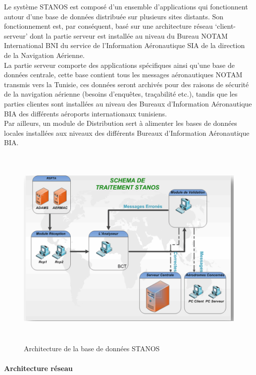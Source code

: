 Le système STANOS est composé d’un ensemble d’applications qui fonctionnent autour d’une base de données distribuée sur plusieurs sites distants. Son fonctionnement est, par conséquent, basé sur une architecture réseau ‘client-serveur’ dont la partie serveur est installée au niveau du Bureau NOTAM International BNI du service de l’Information Aéronautique SIA de la direction de la Navigation Aérienne.\\

La partie serveur comporte des applications spécifiques ainsi qu’une base de données centrale, cette base contient tous les messages aéronautiques NOTAM transmis vers la Tunisie, ces données seront archivés pour des raisons de sécurité de la navigation aérienne (besoins d’enquêtes, traçabilité etc.), tandis que les parties clientes sont installées au niveau des Bureaux d’Information Aéronautique BIA des différents aéroports internationaux tunisiens.\\

Par ailleurs, un module de Distribution sert à alimenter les bases de données locales installées aux niveaux des différents Bureaux d’Information Aéronautique BIA.
~~\\
\begin{figure}[!h]
\begin{center}
\includegraphics[width=17cm,height=10cm]{existant/architecturestanos.png}
\end{center}
\caption{Architecture de la base de données STANOS}
\end{figure}
\newpage
\paragraph{Architecture réseau}
~~\\

